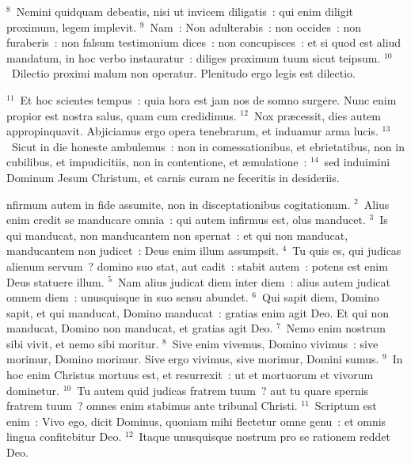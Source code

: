 ${}^{8}$~Nemini quidquam debeatis, nisi ut invicem diligatis~: qui enim diligit proximum, legem implevit.
${}^{9}$~Nam~: Non adulterabis~: non occides~: non furaberis~: non falsum testimonium dices~: non concupisces~: et si quod est aliud mandatum, in hoc verbo instauratur~: diliges proximum tuum sicut teipsum.
${}^{10}$~Dilectio proximi malum non operatur. Plenitudo ergo legis est dilectio.


${}^{11}$~Et hoc scientes tempus~: quia hora est jam nos de somno surgere. Nunc enim propior est nostra salus, quam cum credidimus.
${}^{12}$~Nox pr\ae cessit, dies autem appropinquavit. Abjiciamus ergo opera tenebrarum, et induamur arma lucis.
${}^{13}$~Sicut in die honeste ambulemus~: non in comessationibus, et ebrietatibus, non in cubilibus, et impudicitiis, non in contentione, et \ae mulatione~:
${}^{14}$~sed induimini Dominum Jesum Christum, et carnis curam ne feceritis in desideriis.

\bchapter
{}nfirmum autem in fide assumite, non in disceptationibus cogitationum.
${}^{2}$~Alius enim credit se manducare omnia~: qui autem infirmus est, olus manducet.
${}^{3}$~Is qui manducat, non manducantem non spernat~: et qui non manducat, manducantem non judicet~: Deus enim illum assumpsit.
${}^{4}$~Tu quis es, qui judicas alienum servum~? domino suo stat, aut cadit~: stabit autem~: potens est enim Deus statuere illum.
${}^{5}$~Nam alius judicat diem inter diem~: alius autem judicat omnem diem~: unusquisque in suo sensu abundet.
${}^{6}$~Qui sapit diem, Domino sapit, et qui manducat, Domino manducat~: gratias enim agit Deo. Et qui non manducat, Domino non manducat, et gratias agit Deo.
${}^{7}$~Nemo enim nostrum sibi vivit, et nemo sibi moritur.
${}^{8}$~Sive enim vivemus, Domino vivimus~: sive morimur, Domino morimur. Sive ergo vivimus, sive morimur, Domini sumus.
${}^{9}$~In hoc enim Christus mortuus est, et resurrexit~: ut et mortuorum et vivorum dominetur.
${}^{10}$~Tu autem quid judicas fratrem tuum~? aut tu quare spernis fratrem tuum~? omnes enim stabimus ante tribunal Christi.
${}^{11}$~Scriptum est enim~: Vivo ego, dicit Dominus, quoniam mihi flectetur omne genu~: et omnis lingua confitebitur Deo.
${}^{12}$~Itaque unusquisque nostrum pro se rationem reddet Deo.


